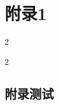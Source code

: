 \chapter{附录1}



\begin{multicols}{2}
\zhlipsum\zhlipsum
\end{multicols}

\clearpage

\begin{multicols}{2}
\zhlipsum
\end{multicols}




\section{附录测试}

